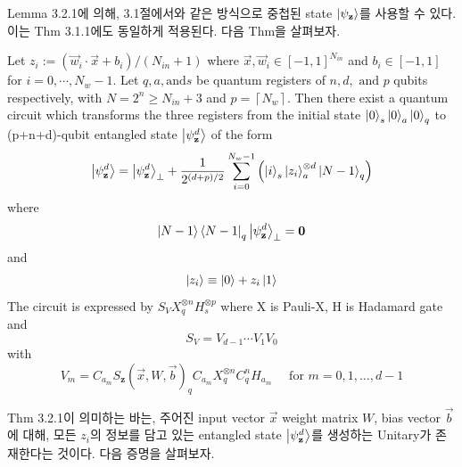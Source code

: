 Lemma 3.2.1에 의해, 3.1절에서와 같은 방식으로 중첩된 state \(\ket{\psi_{\mathbf z}}\)를 사용할 수 있다. 이는 Thm 3.1.1에도 동일하게 적용된다. 다음 Thm을 살펴보자.

\begin{theorem}
    Let \(z_i := \left( \vec{w}_i \cdot \vec{x} + b_i \right) / \left( N_{in} + 1 \right)\) where \(\vec{x}, \vec{w}_i \in [-1, 1]^{N_{in}}\) and \(b_i \in [-1, 1]\) for \(i = 0, \cdots, N_w - 1\). Let $q, a, \text{and} s$ be quantum registers of $n, d, \text{ and } p$ qubits respectively, with \( N = 2^n \ge N_{in} + 3 \) and \( p = \left\lceil N_{w} \right\rceil\). Then there exist a quantum circuit which transforms the three registers from the initial state \(\ket{0}_s \ket{0}_a \ket{0}_q\) to (p+n+d)-qubit entangled state \(\ket{\psi_{\mathbf z}^d}\) of the form
    \[
        \ket{\psi_{\mathbf z}^d} = \ket{\psi_{\mathbf z}^d}_{\perp} + {1 \over {2^{(d + p) / 2}}}\sum_{i=0}^{N_w - 1}\left( \ket{i}_{s} \ket{z_i}_{a}^{\otimes d} \ket{N-1}_q \right)
    \]
    where
    \[
        \ket{N-1}\bra{N-1}_q \ket{\psi_\mathbf{z}^d}_{\perp} = \mathbf{0}
    \]
    and
    \[
        \ket{z_i} \equiv \ket{0} + z_i\ket{1}
    \]
    The circuit is expressed by $S_V X_q^{\otimes n} H_s^{\otimes p}$ where X is Pauli-X, H is Hadamard gate and
    \[
        S_V = V_{d-1} \cdots V_1 V_0
    \]
    with
    \[
        V_m = C_{a_m}S_{\mathbf{z}}(\vec{x}, W, \vec{b})_q C_{a_m}X^{\otimes n}_q C_q^nH_{a_m} \quad \text{ for } m = 0, 1, \dots, d - 1
    \]
\end{theorem}

Thm 3.2.1이 의미하는 바는, 주어진 input vector \(\vec x\) weight matrix \(W\), bias vector \(\vec b\)에 대해, 모든 \(z_i\)의 정보를 담고 있는 entangled state $\ket{\psi_{\mathbf z}^d}$를 생성하는 Unitary가 존재한다는 것이다. 다음 증명을 살펴보자.

